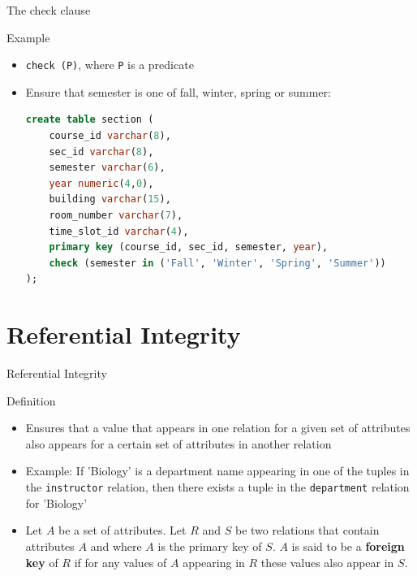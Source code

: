 \documentclass[aspectratio=169, xcolor=dvipsnames]{beamer}
\begin{document}
\begin{frame}[fragile]{The check clause}
    \begin{exampleblock}{Example}
        \begin{itemize}[<+->]
            \item \texttt{check (P)}, where \texttt{P} is a predicate
            \item Ensure that semester is one of fall, winter, spring or summer:
            \begin{lstlisting}[language=SQL, basicstyle=\ttfamily\scriptsize]
create table section ( 
    course_id varchar(8), 
    sec_id varchar(8), 
    semester varchar(6), 
    year numeric(4,0), 
    building varchar(15), 
    room_number varchar(7), 
    time_slot_id varchar(4), 
    primary key (course_id, sec_id, semester, year), 
    check (semester in ('Fall', 'Winter', 'Spring', 'Summer')) 
);
            \end{lstlisting}
        \end{itemize}
    \end{exampleblock}
\end{frame}

\section{Referential Integrity}

\begin{frame}{Referential Integrity}
    \begin{block}{Definition}
        \begin{itemize}[<+->]
            \item Ensures that a value that appears in one relation for a given set of attributes also appears for a certain set of attributes in another relation
            \item Example: If 'Biology' is a department name appearing in one of the tuples in the \texttt{instructor} relation, then there exists a tuple in the \texttt{department} relation for 'Biology'
            \item Let $A$ be a set of attributes. Let $R$ and $S$ be two relations that contain attributes $A$ and where $A$ is the primary key of $S$. $A$ is said to be a \textbf{foreign key} of $R$ if for any values of $A$ appearing in $R$ these values also appear in $S$.
        \end{itemize}
    \end{block}
\end{frame}
\end{document}
